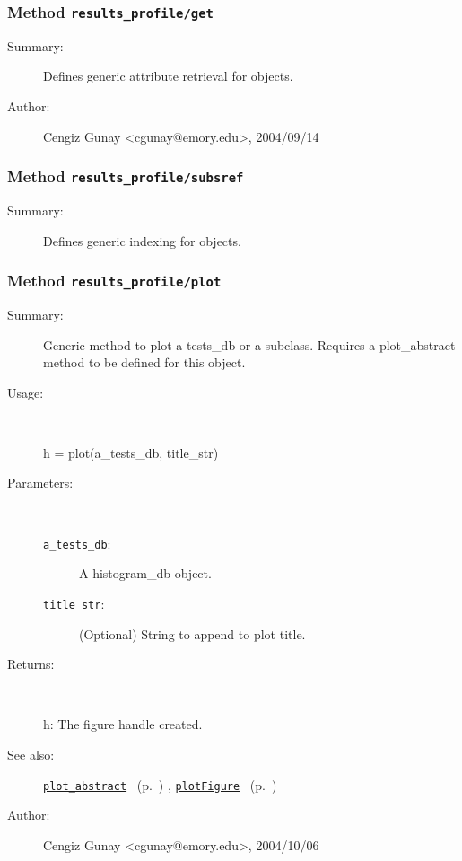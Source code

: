 \subsubsection[Method \texttt{get}]{Method \texttt{results\_profile/get}}%
%
\label{ref_results_profile__get}%
\hypertarget{ref_results_profile__get}{}%
\begin{description}
\item[Summary:]Defines generic attribute retrieval for objects.
%
%
%
%
%
%
%
\item[Author:]%
Cengiz Gunay <cgunay@emory.edu>, 2004/09/14%
\end{description}
\methodline%
\subsubsection[Method \texttt{subsref}]{Method \texttt{results\_profile/subsref}}%
%
\label{ref_results_profile__subsref}%
\hypertarget{ref_results_profile__subsref}{}%
\begin{description}
\item[Summary:]Defines generic indexing for objects.
%
%
%
%
%
%
%
%
\end{description}
\methodline%
\subsubsection[Method \texttt{plot}]{Method \texttt{results\_profile/plot}}%
%
\label{ref_results_profile__plot}%
\hypertarget{ref_results_profile__plot}{}%
\begin{description}
\item[Summary:]Generic method to plot a tests\_db or a subclass. Requires a 
	plot\_abstract method to be defined for this object.
%
\item[Usage:]~%
\begin{lyxcode}%
h = plot(a\_tests\_db, title\_str)
%
\end{lyxcode}%
%
%
\item[Parameters:]~
\begin{description}%
\item[\texttt{a\_tests\_db}:]
 A histogram\_db object.
\item[\texttt{title\_str}:]
 (Optional) String to append to plot title.
\end{description}%
%
\item[Returns:]~

	h: The figure handle created.
%
%
\item[See also:]%
\hyperlink{ref_plot_abstract}{\texttt{plot\_abstract}}%
\ (p.~\pageref{ref_plot_abstract})%
%
, \hyperlink{ref_plotFigure}{\texttt{plotFigure}}%
\ (p.~\pageref{ref_plotFigure})%
%
%
\item[Author:]%
Cengiz Gunay <cgunay@emory.edu>, 2004/10/06%
\end{description}
\methodline%
